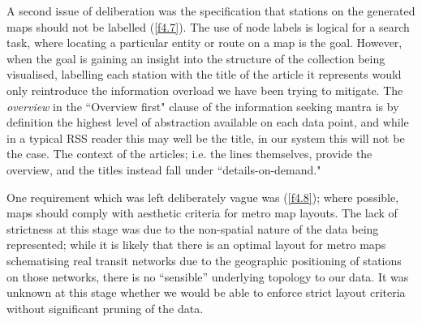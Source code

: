 A second issue of deliberation was the specification that stations on the generated maps should not be labelled (\ref{f4.7}). The use of node labels is logical for a search task, where locating a particular entity or route on a map is the goal. However, when the goal is gaining an insight into the structure of the collection being visualised, labelling each station with the title of the article it represents would only reintroduce the information overload we have been trying to mitigate. The \textit{overview} in the ``Overview first" clause of the information seeking mantra \citep{TheEyesHaveIt} is by definition the highest level of abstraction available on each data point, and while in a typical RSS reader this may well be the title, in our system this will not be the case. The context of the articles; i.e. the lines themselves, provide the overview, and the titles instead fall under ``details-on-demand."

One requirement which was left deliberately vague was (\ref{f4.8}); where possible, maps should comply with  aesthetic criteria for metro map layouts. The lack of strictness at this stage was due to the non-spatial nature of the data being represented; while it is likely that there is an optimal layout for metro maps schematising real transit networks due to the geographic positioning of stations on those networks, there is no ``sensible'' underlying topology to our data. It was unknown at this stage whether we would be able to enforce strict layout criteria without significant pruning of the data.





